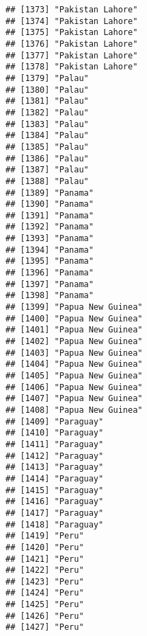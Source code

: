 \documentclass[]{article}
\begin{document}
\begin{verbatim}
## [1373] "Pakistan Lahore"                    
## [1374] "Pakistan Lahore"                    
## [1375] "Pakistan Lahore"                    
## [1376] "Pakistan Lahore"                    
## [1377] "Pakistan Lahore"                    
## [1378] "Pakistan Lahore"                    
## [1379] "Palau"                              
## [1380] "Palau"                              
## [1381] "Palau"                              
## [1382] "Palau"                              
## [1383] "Palau"                              
## [1384] "Palau"                              
## [1385] "Palau"                              
## [1386] "Palau"                              
## [1387] "Palau"                              
## [1388] "Palau"                              
## [1389] "Panama"                             
## [1390] "Panama"                             
## [1391] "Panama"                             
## [1392] "Panama"                             
## [1393] "Panama"                             
## [1394] "Panama"                             
## [1395] "Panama"                             
## [1396] "Panama"                             
## [1397] "Panama"                             
## [1398] "Panama"                             
## [1399] "Papua New Guinea"                   
## [1400] "Papua New Guinea"                   
## [1401] "Papua New Guinea"                   
## [1402] "Papua New Guinea"                   
## [1403] "Papua New Guinea"                   
## [1404] "Papua New Guinea"                   
## [1405] "Papua New Guinea"                   
## [1406] "Papua New Guinea"                   
## [1407] "Papua New Guinea"                   
## [1408] "Papua New Guinea"                   
## [1409] "Paraguay"                           
## [1410] "Paraguay"                           
## [1411] "Paraguay"                           
## [1412] "Paraguay"                           
## [1413] "Paraguay"                           
## [1414] "Paraguay"                           
## [1415] "Paraguay"                           
## [1416] "Paraguay"                           
## [1417] "Paraguay"                           
## [1418] "Paraguay"                           
## [1419] "Peru"                               
## [1420] "Peru"                               
## [1421] "Peru"                               
## [1422] "Peru"                               
## [1423] "Peru"                               
## [1424] "Peru"                               
## [1425] "Peru"                               
## [1426] "Peru"                               
## [1427] "Peru"                               

\end{verbatim}
\end{document}
